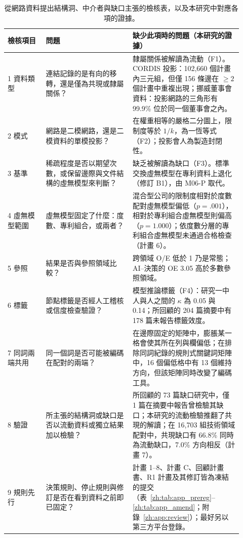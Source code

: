\begin{table}[tbp]
  \centering
  \caption{從網路資料提出結構洞、中介者與缺口主張的檢核表，以及本研究中對應各項的證據。}
  \label{zh:tab:checklist}
  \footnotesize
  \renewcommand{\arraystretch}{1.15}
  \begin{tabular}{p{0.15\linewidth}p{0.34\linewidth}p{0.43\linewidth}}
    \toprule
    檢核項目 & 問題 & 缺少此項時的問題（本研究的證據） \\
    \midrule
    1 資料類型 & 連結記錄的是有向的移轉，還是僅為共現或隸屬關係？ & 隸屬關係被解讀為流動（F1）。CORDIS 投影：102,660 個計畫內三元組，但僅 156 條邊在 $\geq 2$ 個計畫中重複出現；挪威董事會資料：投影網路的三角形有 99.9\% 位於同一個董事會之內。 \\
    2 模式 & 網路是二模網路，還是二模資料的單模投影？ & 在權重相等的嚴格二分圖上，限制度等於 $1/k$，為一恆等式（F2）；投影會人為製造封閉性。 \\
    3 基準 & 稀疏程度是否以期望次數，或保留邊際與文件結構的虛無模型來判斷？ & 缺乏被解讀為缺口（F3）。標準交換虛無模型在專利資料上退化（修訂 B1），由 M06-P 取代。 \\
    4 虛無模型範圍 & 虛無模型固定了什麼：度數、專利組合，或兩者？ & 混合型公司的限制度相對於度數配對虛無模型偏低（$p=.001$），相對於專利組合虛無模型則偏高（$p=1.000$）；依度數分層的專利組合虛無模型未通過合格檢查（計畫 6）。 \\
    5 參照 & 結果是否與參照領域比較？ & 跨領域 O/E 低於 1 乃是常態；AI--決策的 OE 3.05 高於多數參照領域。 \\
    6 標籤 & 節點標籤是否經人工稽核或信度檢查驗證？ & 模型推論標籤（F4）：研究一中人與人之間的 $\kappa$ 為 0.05 與 0.14；所回顧的 204 篇摘要中有 178 篇未報告標籤效度。 \\
    7 同詞兩端共用 & 同一個詞是否可能被編碼在配對的兩端？ & 在邊際固定的矩陣中，膨脹某一格會使其所在列與欄偏低；在排除同詞紀錄的規則式關鍵詞矩陣中，16 個偏低格中有 13 個維持方向，但該矩陣同時改變了編碼工具。 \\
    8 驗證 & 所主張的結構洞或缺口是否以流動資料或獨立結果加以檢驗？ & 所回顧的 73 篇缺口研究中，僅 1 篇在摘要中報告曾檢驗其缺口；本研究的流動檢驗推翻了共現的解讀；在 16,703 組技術領域配對中，共現缺口有 66.8\% 同時為流動缺口，7.0\% 方向相反（計畫 7）。 \\
    9 規則先行 & 決策規則、停止規則與修訂是否在看到資料之前即已固定？ & 計畫 1--8、計畫 C、回顧計畫書、R1 計畫及其修訂皆為凍結的提交（表~\ref{zh:tab:app_prereg}--\ref{zh:tab:app_amend}；附錄~\ref{zh:app:review}）；最好另以第三方平台登錄。 \\
    \bottomrule
  \end{tabular}
\end{table}

